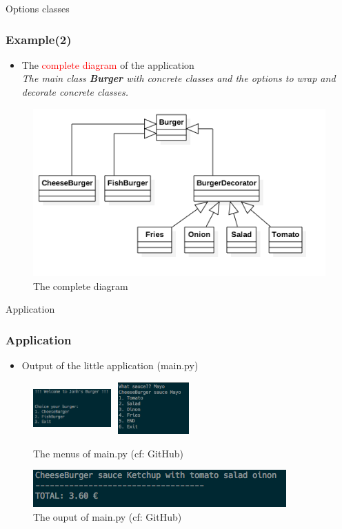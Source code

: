 \documentclass{beamer}
\begin{document}
  \begin{frame}{Options classes}
    \frametitle{Example(2)}
    \begin{itemize}
      \item The \textcolor{red}{complete diagram} of the application\\
      \textit{The main class \textbf{Burger} with concrete classes and the options to wrap and decorate concrete classes.}
    \end{itemize}
    \begin{figure}[!b]
      \centering
      \includegraphics[scale=0.4]{Burger}
      \caption{The complete diagram}
    \end{figure}
  \end{frame}

  \begin{frame}{Application}
    \frametitle{Application}
    \begin{itemize}
      \item Output of the little application (main.py)\\
    \end{itemize}
      \begin{figure}
        \includegraphics[width=3cm, height=2cm]{first}
        \includegraphics[width=3cm, height=2cm]{second}
        \caption{The menus of main.py (cf: GitHub)}
      \end{figure}
      \begin{figure}[!b]
        \centering
        \includegraphics[scale=0.4]{third}
        \caption{The ouput of main.py (cf: GitHub)}
      \end{figure}

  \end{frame}
\end{document}
